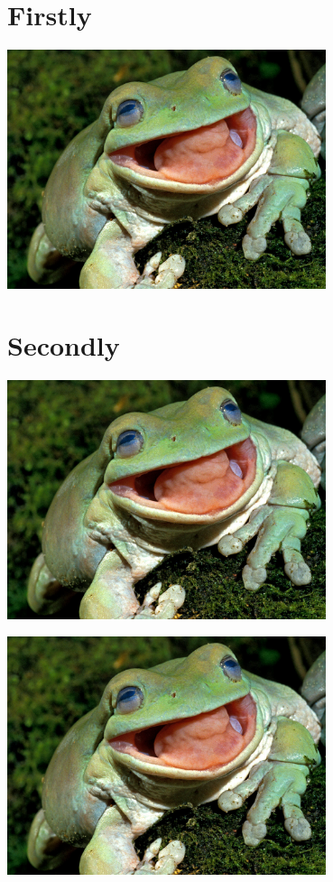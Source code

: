 \documentclass[9pt,lineno]{elife}
\begin{document}
\appendix
\begin{appendixbox}
\label{first:app}
\section{Firstly}
\lipsum[1]

\begin{center}
\includegraphics[width=\linewidth,height=7cm]{frog}
\end{center}

\section{Secondly}

\lipsum[5-8]

\begin{center}
\includegraphics[width=\linewidth,height=7cm]{frog}
\end{center}

\end{appendixbox}

\begin{appendixbox}
\includegraphics[width=\linewidth,height=7cm]{frog}
\end{appendixbox}
\end{document}
